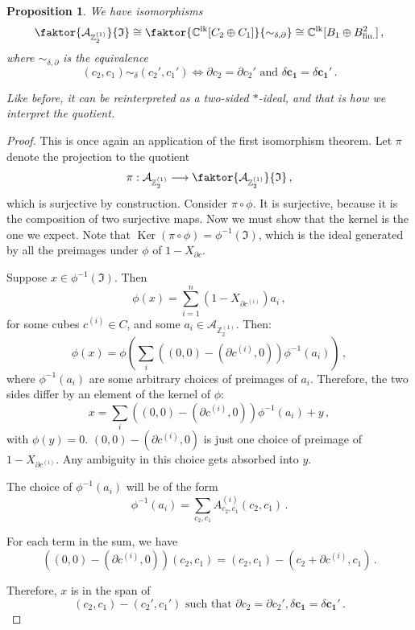 \documentclass[aps,twocolumn,prx,floatfix,preprintnumbers, nofootinbib,10pt]{revtex4-2}
\numberwithin{equation}{section}
\newtheorem{proposition}[theorem]{Proposition}
\theoremstyle{definition}
\theoremstyle{remark}
\theoremstyle{claim}
\newcommand{\be}{\begin{equation}}
\newcommand{\ee}{\end{equation}}
\renewcommand{\ker}{\operatorname{Ker}}
\newcommand{\Z}{{\mathbb Z}}
\newcommand{\mc}[1]{\mathcal{#1}}
\newcommand{\paren}[1]{\left( #1 \right)}
\begin{document}
\begin{proposition}\label{prop:isomorphisms2}
 We have isomorphisms
 \be
 \faktor{\mc{A}_{\Z_2^{(1)}}}{\mathfrak{I}} \cong \faktor{\mathbb{C}^\text{lk}[C_2 \oplus C_1]}{\sim_{\delta, \partial}} \cong \mathbb{C}^\text{lk}[B_1 \oplus B^2_\text{fin.}] \,,
 \ee
 where $\sim_{\delta, \partial}$ is the equivalence
 \be
 (c_2, c_1) \sim_\delta (c_2', c_1') \iff \partial c_2 = \partial c_2' \text{ and } \delta \bm{c_1} = \delta \bm{c_1'} \,.
 \ee

 Like before, it can be reinterpreted as a two-sided $*$-ideal, and that is how we interpret the quotient.
\end{proposition}

\begin{proof}
 This is once again an application of the first isomorphism theorem. Let $\pi$ denote the projection to the quotient
 \be
 \pi : \mc{A}_{\Z_2^{(1)}} \longrightarrow \faktor{\mc{A}_{\Z_2^{(1)}}}{\mathfrak{I}} \,,
 \ee
 which is surjective by construction. Consider $\pi \circ \phi$. It is surjective, because it is the composition of two surjective maps. Now we must show that the kernel is the one we expect. Note that $\ker (\pi \circ \phi) = \phi^{-1}(\mathfrak{I})$, which is the ideal generated by all the preimages under $\phi$ of $1 - X_{\partial c}$.

 Suppose $x \in \phi^{-1}(\mathfrak{I})$. Then
 \be
 \phi(x) = \sum_{i=1}^n (1 - X_{\partial c^{(i)}}) a_i \,,
 \ee
 for some cubes $c^{(i)} \in C$, and some $a_i \in \mc{A}_{\Z_2^{(1)}}$. Then:
 \be
 \phi(x) = \phi \paren{ \sum_{i} ((0,0) - (\partial c^{(i)}, 0)) \phi^{-1}(a_i) } \,,
 \ee
 where $\phi^{-1}(a_i)$ are some arbitrary choices of preimages of $a_i$. Therefore, the two sides differ by an element of the kernel of $\phi$:
 \be
 x = \sum_{i} ((0,0) - (\partial c^{(i)}, 0)) \phi^{-1}(a_i) + y \,,
 \ee
 with $\phi(y) = 0$. $(0, 0) - (\partial c^{(i)}, 0)$ is just one choice of preimage of $1 - X_{\partial c^{(i)}}$. Any ambiguity in this choice gets absorbed into $y$.

 The choice of $\phi^{-1}(a_i)$ will be of the form
 \be
 \phi^{-1}(a_i) = \sum_{c_2, c_1} A^{(i)}_{c_2, c_1} (c_2, c_1) \,.
 \ee

 For each term in the sum, we have
 \be
 \paren{(0, 0) - (\partial c^{(i)}, 0)} (c_2, c_1) = (c_2, c_1) - (c_2 + \partial c^{(i)}, c_1) \,.
 \ee

 Therefore, $x$ is in the span of
 \be
 (c_2, c_1) - (c_2', c_1') \text{ such that } \partial c_2 = \partial c_2', \delta \bm{c_1} = \delta \bm{c_1'} \,.
 \ee


\end{proof}
\end{document}
